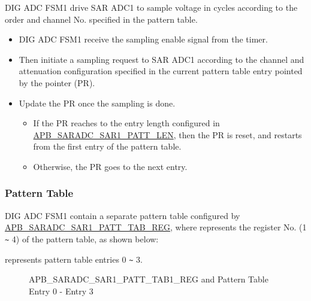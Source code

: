 \documentclass[main\_\_EN.tex]{subfiles}
\begin{document}
DIG ADC FSM1 drive SAR ADC1 to sample voltage in cycles according to the order and channel No. specified in the pattern table.

\begin{itemize}
    \item DIG ADC FSM1 receive the sampling enable signal from the timer.
    \item Then initiate a sampling request to SAR ADC1 according to the channel and attenuation configuration specified in the current pattern table entry pointed by the pointer (PR).
    \item Update the PR once the sampling is done.
    \begin{itemize}
        \item If the PR reaches to the entry length configured in \hyperref[fielddesc:APBSARADCSAR1PATTLEN]{APB\_SARADC\_SAR1\_PATT\_LEN}, then the PR is reset, and restarts from the first entry of the pattern table.
        \item Otherwise, the PR goes to the next entry.
    \end{itemize}
\end{itemize}


\subsubsection{Pattern Table}

DIG ADC FSM1 contain a separate pattern table configured by \hyperref[regdesc:APBSARADCSAR1PATTTAB1REG]{APB\_SARADC\_SAR1\_PATT\_TAB\_REG}, where  represents the register No. (1 \verb+~+ 4) of the pattern table, as shown below:

%
%
%
%
%
\begin{regdesc}\begin{reglist}
\item [cmd \regindex{n} (\regindex{n} = 0 - 3)] represents pattern table entries 0 \verb+~+ 3.
\end{reglist}\end{regdesc}
\vspace{-2em}
\begin{figure}[H]
    \centering
    \caption{APB\_SARADC\_SAR1\_PATT\_TAB1\_REG and Pattern Table Entry 0 - Entry 3}
    \label{fig:pattern-tab-1}
\end{figure}
\end{document}

